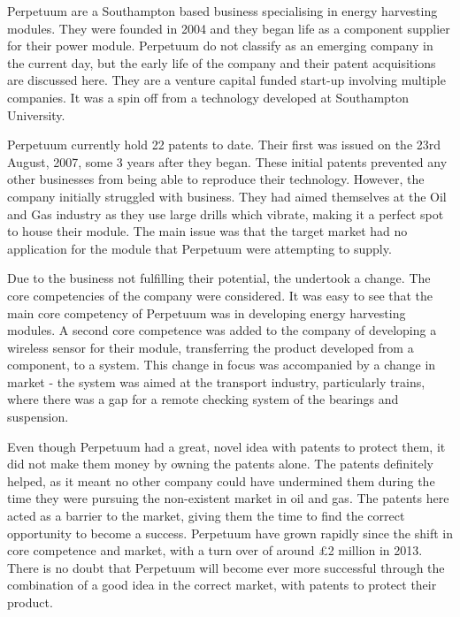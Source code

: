 {}


Perpetuum are a Southampton based business specialising in energy harvesting modules. 
They were founded in 2004 and they began life as a component supplier for their power module.
Perpetuum do not classify as an emerging company in the current day, but the early life of the company and their patent acquisitions are discussed here. 
They are a venture capital funded start-up involving multiple companies.
It was a spin off from a technology developed at Southampton University. 

Perpetuum currently hold 22 patents to date. 
Their first was issued on the 23rd August, 2007, some 3 years after they began.
These initial patents prevented any other businesses from being able to reproduce their technology. 
However, the company initially struggled with business.
They had aimed themselves at the Oil and Gas industry as they use large drills which vibrate, making it a perfect spot to house their module.
The main issue was that the target market had no application for the module that Perpetuum were attempting to supply. 

Due to the business not fulfilling their potential, the undertook a change. 
The core competencies of the company were considered.
It was easy to see that the main core competency of Perpetuum was in developing energy harvesting modules. 
A second core competence was added to the company of developing a wireless sensor for their module, transferring the product developed from a component, to a system.
This change in focus was accompanied by a change in market - the system was aimed at the transport industry, particularly trains, where there was a gap for a remote checking system of the bearings and suspension. 

Even though Perpetuum had a great, novel idea with patents to protect them, it did not make them money by owning the patents alone.
The patents definitely helped, as it meant no other company could have undermined them during the time they were pursuing the non-existent market in oil and gas.
The patents here acted as a barrier to the market, giving them the time to find the correct opportunity to become a success.
Perpetuum have grown rapidly since the shift in core competence and market, with a turn over of around \pounds 2 million in 2013.
There is no doubt that Perpetuum will become ever more successful through the combination of a good idea in the correct market, with patents to protect their product. 

